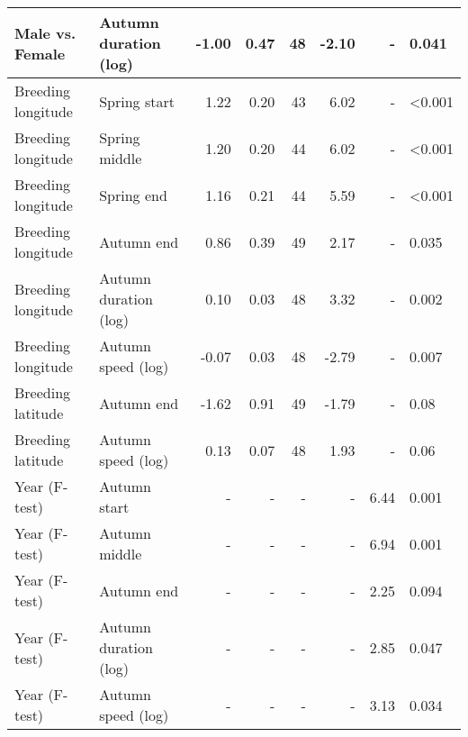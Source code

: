 \documentclass[a4paper, nobind]{templates/ociamthesis}
\begin{document}
\begin{table}[t]
\begin{tabular}{l|l|r|r|r|r|r|l}
\hline
Male vs. Female & Autumn duration (log) & -1.00 & 0.47 & 48 & -2.10 & - & 0.041\\
\hline
Breeding longitude & Spring start & 1.22 & 0.20 & 43 & 6.02 & - & <0.001\\
\hline
Breeding longitude & Spring middle & 1.20 & 0.20 & 44 & 6.02 & - & <0.001\\
\hline
Breeding longitude & Spring end & 1.16 & 0.21 & 44 & 5.59 & - & <0.001\\
\hline
Breeding longitude & Autumn end & 0.86 & 0.39 & 49 & 2.17 & - & 0.035\\
\hline
Breeding longitude & Autumn duration (log) & 0.10 & 0.03 & 48 & 3.32 & - & 0.002\\
\hline
Breeding longitude & Autumn speed (log) & -0.07 & 0.03 & 48 & -2.79 & - & 0.007\\
\hline
Breeding latitude & Autumn end & -1.62 & 0.91 & 49 & -1.79 & - & 0.08\\
\hline
Breeding latitude & Autumn speed (log) & 0.13 & 0.07 & 48 & 1.93 & - & 0.06\\
\hline
Year (F-test) & Autumn start & - & - & - & - & 6.44 & 0.001\\
\hline
Year (F-test) & Autumn middle & - & - & - & - & 6.94 & 0.001\\
\hline
Year (F-test) & Autumn end & - & - & - & - & 2.25 & 0.094\\
\hline
Year (F-test) & Autumn duration (log) & - & - & - & - & 2.85 & 0.047\\
\hline
Year (F-test) & Autumn speed (log) & - & - & - & - & 3.13 & 0.034\\
\hline
\end{tabular}
\end{table}
\end{document}
